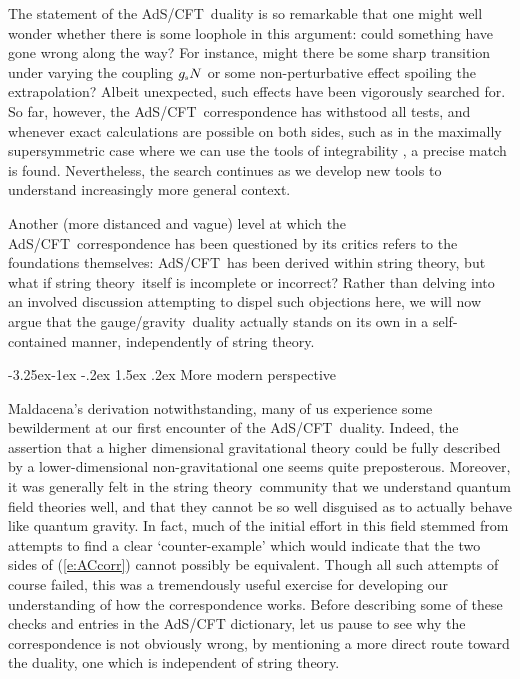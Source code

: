 \documentclass[12pt,a4paper]{article}
\makeatletter
\renewcommand\subsection{\@startsection{subsection}{2}{\z@}%
                                     {-3.25ex\@plus -1ex \@minus -.2ex}%
                                     {1.5ex \@plus .2ex}%
                                     {\normalfont\bfseries}}
\def\req#1{(\ref{#1})}
\def\AC{AdS/CFT}
\def\GG{gauge/gravity}
\def\STY{string theory}
\def\gst{g_{\scriptscriptstyle {\rm s}}}
\makeatother
\begin{document}
The statement of the \AC\ duality is so remarkable that one might well wonder whether there is some loophole in this argument:  could something have gone wrong along the way?  For instance, might there be some sharp transition under varying the coupling $\gst N$ or some non-perturbative effect spoiling the extrapolation?  Albeit unexpected, such effects have been vigorously searched for.  So far, however, the \AC\ correspondence has withstood all tests, and whenever exact calculations are possible on both sides, such as in the maximally supersymmetric case where we can use the tools of integrability \cite{Beisert:2010jr}, a precise match is found.  Nevertheless, the search continues as we develop new tools to understand increasingly more general context.

Another (more distanced and vague) level at which the \AC\ correspondence has been questioned by its critics refers to the foundations themselves:  \AC\ has been derived within \STY, but what if \STY\ itself is incomplete or incorrect?  Rather than delving into an involved discussion attempting to dispel such objections here, we will now argue that the \GG\ duality actually stands on its own in a self-contained manner,  independently of \STY.


\subsection{More modern perspective}
\label{s:ACmodern}

Maldacena's derivation notwithstanding, many of us experience some bewilderment at our first encounter of the \AC\ duality.
Indeed, the assertion that a higher dimensional gravitational theory could be fully described by a  lower-dimensional non-gravitational one seems quite preposterous.  
Moreover, it was generally felt in the \STY\ community that we understand quantum field theories well, and that they cannot be so well disguised as  to actually behave like quantum gravity.
 In fact, much of the initial effort in this field stemmed from attempts to find a clear `counter-example' which would indicate that the two sides of \req{e:ACcorr} cannot possibly be equivalent.  Though all such attempts of course failed, this was a tremendously useful exercise for developing our understanding of how the correspondence works.
Before describing some of these checks and entries in the AdS/CFT dictionary, let us pause to see why the correspondence is not obviously wrong, by mentioning a more direct route toward the duality, one which is independent of string theory.
\end{document}
